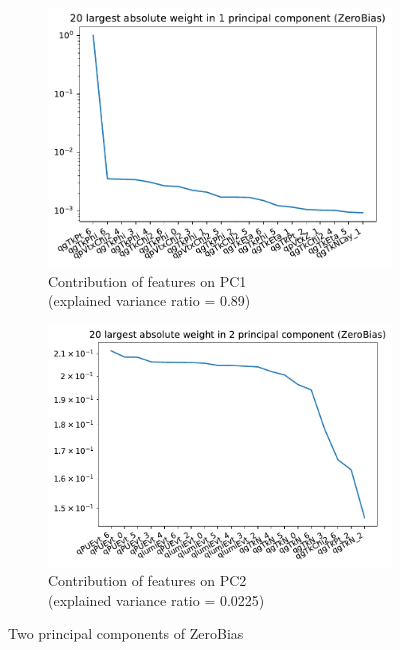 \begin{figure}[h!]
\begin{subfigure}[b]{0.49\linewidth}
        \includegraphics[width=\linewidth]{images/reco/2018/feature_2/ZeroBias_pc1.pdf}
        \caption{Contribution of features on PC1 \\ (explained variance ratio = 0.89)}
    \end{subfigure}
    \begin{subfigure}[b]{0.49\linewidth}
        \includegraphics[width=\linewidth]{images/reco/2018/feature_2/ZeroBias_pc2.pdf}
        \caption{Contribution of features on PC2 \\ (explained variance ratio = 0.0225)}
    \end{subfigure}
    \caption{Two principal components of ZeroBias}
\label{fig:2018_ZeroBias_subsystem_label}
\end{figure}

